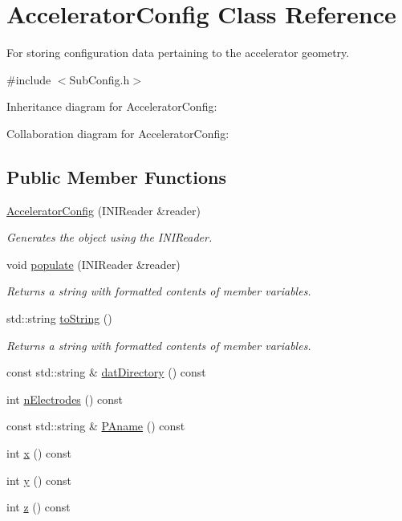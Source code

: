 \hypertarget{classAcceleratorConfig}{\section{Accelerator\+Config Class Reference}
\label{classAcceleratorConfig}
}


For storing configuration data pertaining to the accelerator geometry.  




{\ttfamily \#include $<$Sub\+Config.\+h$>$}



Inheritance diagram for Accelerator\+Config\+:


Collaboration diagram for Accelerator\+Config\+:
\subsection*{Public Member Functions}
\begin{DoxyCompactItemize}
\item 
\hyperlink{classAcceleratorConfig_a31ce99a9a66faf53a70f30ba396040d9}{Accelerator\+Config} (I\+N\+I\+Reader \&reader)
\begin{DoxyCompactList}\small\item\em Generates the object using the I\+N\+I\+Reader. \end{DoxyCompactList}\item 
void \hyperlink{classAcceleratorConfig_a437db574794d1bd9ffbf2a5d5dfc75ae}{populate} (I\+N\+I\+Reader \&reader)
\begin{DoxyCompactList}\small\item\em Returns a string with formatted contents of member variables. \end{DoxyCompactList}\item 
std\+::string \hyperlink{classAcceleratorConfig_a2d7943bead17ab085c024d52a3cc04a5}{to\+String} ()
\begin{DoxyCompactList}\small\item\em Returns a string with formatted contents of member variables. \end{DoxyCompactList}\item 
const std\+::string \& \hyperlink{classAcceleratorConfig_a5e01a698f42c1c66bf36693eca3b5ac7}{dat\+Directory} () const 
\item 
int \hyperlink{classAcceleratorConfig_a94150ed4ea5910a5108f30ae3f4489fe}{n\+Electrodes} () const 
\item 
const std\+::string \& \hyperlink{classAcceleratorConfig_acf2e3d63178d5eb3838dc382f4596c9c}{P\+Aname} () const 
\item 
int \hyperlink{classAcceleratorConfig_ab170b0621b9a29003d63f5ebfe267064}{x} () const 
\item 
int \hyperlink{classAcceleratorConfig_a9e56e154cdef9586d6d9a2c2b26891b7}{y} () const 
\item 
int \hyperlink{classAcceleratorConfig_a303ff7ce6377d67fe340252017cd17ea}{z} () const 
\end{DoxyCompactItemize}
